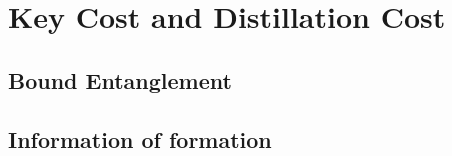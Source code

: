 	\section{Key Cost and Distillation Cost}

		\subsection{Bound Entanglement}
		
		\subsection{Information of formation}
